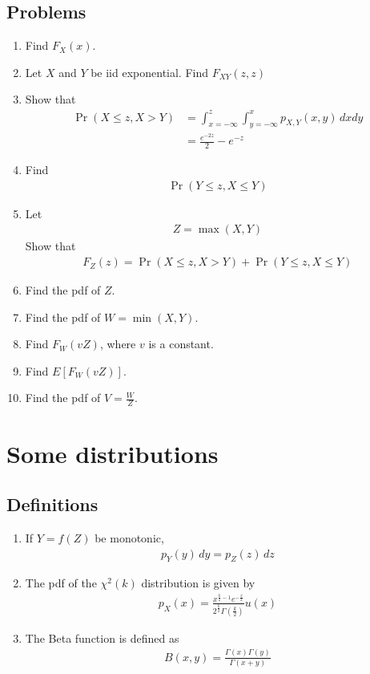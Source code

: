 \documentclass[journal,12pt,onecolumn]{IEEEtran}
\renewcommand\thesection{\arabic{section}}
\renewcommand\thesubsection{\thesection.\arabic{subsection}}
\providecommand{\pr}[1]{\ensuremath{\Pr\left(#1\right)}}
\providecommand{\sbrak}[1]{\ensuremath{{}\left[#1\right]}}
\providecommand{\brak}[1]{\ensuremath{\left(#1\right)}}
\theoremstyle{remark}
\numberwithin{equation}{section}
\begin{document}
\subsection{Problems}
\begin{enumerate}[label=\arabic*.,ref=\thesubsection.\theenumi]
\item Find $F_X(x)$.
\item  Let $X$ and $Y$ be iid exponential.   Find
	$F_{XY}\brak{z,z}$
\item  Show that
\begin{align}
	\pr{X\leq z,X>Y} &= \int _{x = -\infty}^{z}\int _{y=-\infty}^{x} p_{X,Y}(x,y) \,dxdy 
	\\
	&= \frac{e^{-2z}}{2} - e^{-z}
\end{align}
\item Find 
\begin{align}
	\pr{Y\leq z,X\leq Y} 
\end{align}
\item Let 
\begin{align}
Z = \max(X,Y)
\end{align}
Show that
\begin{align}
	F_Z(z) =\pr{X\leq z,X>Y}+ \pr{Y\leq z,X\leq Y}
\end{align}
\item Find the pdf of $Z$.
\item Find the pdf of $W=\min(X,Y)$.
\item Find $F_{W}(vZ)$, where $v$ is a constant.
\item Find $E\sbrak{F_{W}(vZ)}$.
\item Find the pdf of $V = \frac{W}{Z}$.
\end{enumerate}
\section{Some distributions}
\subsection{Definitions}
\begin{enumerate}[label=\arabic*.,ref=\thesubsection.\theenumi]
\item If $Y = f(Z)$ be monotonic,
	\begin{align}
		p_Y(y) \, dy = p_Z(z)\,dz
	\end{align}
\item The pdf of the $\chi^2(k)$ distribution is given by
	\begin{align}
		p_X(x) = \frac{x^{\frac{k}{2}-1}e^{-\frac{x}{2}}}{2^{\frac{k}{2}}\Gamma\brak{\frac{k}{2}}} u(x)
	\end{align}
\item The Beta function is defined as
	\begin{align}
		B\brak{x,y} = \frac{\Gamma(x)\Gamma(y)}{\Gamma\brak{x+y}}
	\end{align}
\end{enumerate}
\end{document}

